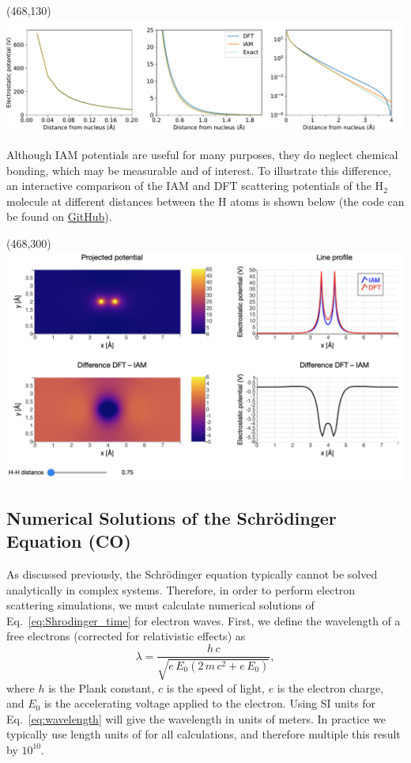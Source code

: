 \documentclass[%
 superscriptaddress,
 aip,
 amsmath,amssymb,
preprint,%
 author-year,%
longbibliography
]{revtex4-2}
\newcommand{\angstroms}{\text{\normalfont\AA}}
\begin{document}
\framebox(468,130){
    \includegraphics[width=1\textwidth]{figures/H_atom.pdf}
    \label{fig:H_atom}
}

Although IAM potentials are useful for many purposes, they do neglect chemical bonding, which may be measurable and of interest. To illustrate this difference, an interactive comparison of the IAM and DFT scattering potentials of the H$_2$ molecule at different distances between the H atoms is shown below (the code can be found on \href{https://github.com/jacobjma/hands-on-guide-to-TEM-simulations/blob/main/notebooks/toma/H2_molecule.ipynb}{GitHub}).

\framebox(468,300){
\includegraphics[width=1\textwidth]{figures/H2_molecule_widget.png}}

\subsection*{Numerical Solutions of the Schr\"{o}dinger Equation (CO)}

As discussed previously, the Schr\"{o}dinger equation typically cannot be solved analytically in complex systems. Therefore, in order to perform electron scattering simulations, we must calculate numerical solutions of Eq.~\ref{eq:Shrodinger_time} for electron waves. First, we define the \cite{debroglie1925recherches} wavelength of a free electrons (corrected for relativistic effects) as
\begin{equation}
    \lambda = \frac{h \, c}{\sqrt{e \, E_0 (2 \, m \, c^2 + e \, E_0)}},
    \label{eq:wavelength}
\end{equation}
where $h$ is the Plank constant, $c$ is the speed of light, $e$ is the electron charge, and $E_0$ is the accelerating voltage applied to the electron. Using SI units for Eq.~\ref{eq:wavelength} will give the wavelength in units of meters. In practice we typically use length units of \angstroms{} for all calculations, and therefore multiple this result by $10^{10}$.
\end{document}
